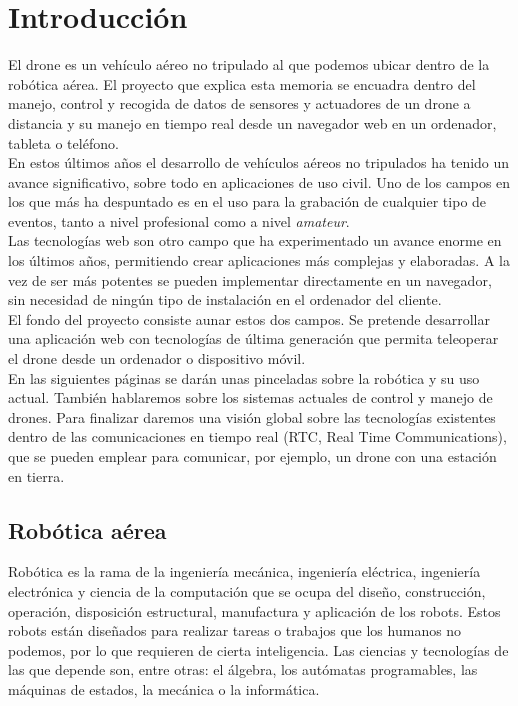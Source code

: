 \chapter{Introducción}

El drone es un vehículo aéreo no tripulado al que podemos ubicar dentro de la robótica aérea. El proyecto que explica esta memoria se encuadra dentro del manejo, control y recogida de datos de sensores y actuadores de un drone a distancia y su manejo en tiempo real desde un navegador web en un ordenador, tableta o teléfono.\\

En estos últimos años el desarrollo de vehículos aéreos no tripulados ha tenido un avance significativo, sobre todo en aplicaciones de uso civil. Uno de los campos en los que más ha despuntado es en el uso para la grabación de cualquier tipo de eventos, tanto a nivel profesional como a nivel \emph{amateur}.\\

Las tecnologías web son otro campo que ha experimentado un avance enorme en los últimos años, permitiendo crear aplicaciones más complejas y elaboradas. A la vez de ser más potentes se pueden implementar directamente en un navegador, sin necesidad de ningún tipo de instalación en el ordenador del cliente.\\

El fondo del proyecto consiste aunar estos dos campos. Se pretende desarrollar una aplicación web con tecnologías de última generación que permita teleoperar el drone desde un ordenador o dispositivo móvil.\\

En las siguientes páginas se darán unas pinceladas sobre la robótica y su uso actual. También hablaremos sobre los sistemas actuales de control y manejo de drones. Para finalizar daremos una visión global sobre las tecnologías existentes dentro de las comunicaciones en tiempo real (RTC, Real Time Communications), que se pueden emplear para comunicar, por ejemplo, un drone con una estación en tierra.\\

\section{Robótica aérea}

Robótica es la rama de la ingeniería mecánica, ingeniería eléctrica, ingeniería electrónica y ciencia de la computación que se ocupa del diseño, construcción, operación, disposición estructural, manufactura y aplicación de los robots. Estos robots están diseñados para realizar tareas o trabajos que los humanos no podemos, por lo que requieren de cierta inteligencia. Las ciencias y tecnologías de las que depende son, entre otras: el álgebra, los autómatas programables, las máquinas de estados, la mecánica o la informática.\\

